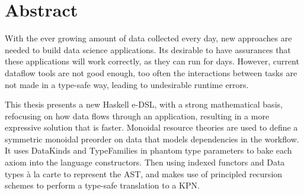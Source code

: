\documentclass[dissertation.tex]{subfiles}
\begin{document}
\chapter*{Abstract}\label{chap:abstract}

With the ever growing amount of data collected every day, new approaches are needed to build data science applications.
Its desirable to have assurances that these applications will work correctly, as they can run for days.
However, current dataflow tools are not good enough, too often the interactions between tasks are not made in a type-safe way, leading to undesirable runtime errors.


This thesis presents a new Haskell \acs{e-DSL}, with a strong mathematical basis, refocusing on how data flows through an application, resulting in a more expressive solution that is faster.
Monoidal resource theories are used to define a symmetric monoidal preorder on data that models dependencies in the workflow.
It uses DataKinds and TypeFamilies in phantom type parameters to bake each axiom into the language constructors.
Then using indexed functors and Data types \`{a} la carte to represent the \acs{AST}, and makes use of principled recursion schemes to perform a type-safe translation to a \acf{KPN}.











\end{document}
